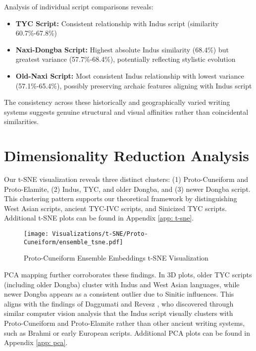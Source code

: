 \documentclass[11pt,a4paper,oneside]{report}
\begin{document}
Analysis of individual script comparisons reveals:

\begin{itemize}
    \item \textbf{TYC Script:} Consistent relationship with Indus script (similarity 60.7\%-67.8\%)

    \item \textbf{Naxi-Dongba Script: }Highest absolute Indus similarity (68.4\%) but greatest variance (57.7\%-68.4\%), potentially reflecting stylistic evolution

    \item \textbf{Old-Naxi Script:} Most consistent Indus relationship with lowest variance (57.1\%-65.4\%), possibly preserving archaic features aligning with Indus script
\end{itemize}

The consistency across these historically and geographically varied writing systems suggests genuine structural and visual affinities rather than coincidental similarities.

\newpage
\section{Dimensionality Reduction Analysis}
\noindent\hspace{1cm}
Our t-SNE visualization reveals three distinct clusters: (1) Proto-Cuneiform and Proto-Elamite, (2) Indus, TYC, and older Dongba, and (3) newer Dongba script. This clustering pattern supports our theoretical framework by distinguishing West Asian scripts, ancient TYC-IVC scripts, and Sinicized TYC scripts. Additional t-SNE plots can be found in Appendix \ref{app: t-sne}.

\begin{figure}[H] 
    \centering
    \texttt{[image: Visualizations/t-SNE/Proto-Cuneiform/ensemble\_tsne.pdf]}
    \caption{Proto-Cuneiform Ensemble Embeddings t-SNE Visualization}
    \label{fig:t-sne}
\end{figure}

PCA mapping further corroborates these findings. In 3D plots, older TYC scripts (including older Dongba) cluster with Indus and West Asian languages, while newer Dongba appears as a consistent outlier due to Sinitic influences. This aligns with the findings of Daggumati and Revesz \cite{daggumati_convolutional_2023, daggumati_data_2018, daggumati_data_2019}, who discovered through similar computer vision analysis that the Indus script visually clusters with Proto-Cuneiform and Proto-Elamite rather than other ancient writing systems, such as Brahmi or early European scripts. Additional PCA plots can be found in Appendix \ref{app: pca}.
\end{document}
